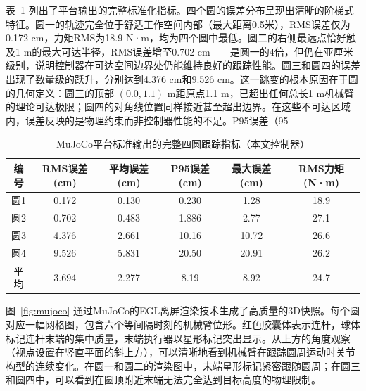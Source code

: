 \documentclass{article}
\begin{document}
表~\ref{tab:metrics} 列出了平台输出的完整标准化指标。四个圆的误差分布呈现出清晰的阶梯式特征。圆一的轨迹完全位于舒适工作空间内部（最大距离0.5米），RMS误差仅为0.172 cm，力矩RMS为18.9 N·m，均为四个圆中最低。圆二的右侧最远点恰好触及1 m的最大可达半径，RMS误差增至0.702 cm——是圆一的4倍，但仍在亚厘米级别，说明控制器在可达空间边界处仍能维持良好的跟踪性能。圆三和圆四的误差出现了数量级的跃升，分别达到4.376 cm和9.526 cm。这一跳变的根本原因在于圆的几何定义：圆三的顶部 \((0.0, 1.1)\) m距原点1.1 m，已超出任何总长1 m机械臂的理论可达极限；圆四的对角线位置同样接近甚至超出边界。在这些不可达区域内，误差反映的是物理约束而非控制器性能的不足。P95误差（95\\%

\begin{table}[H]
\centering
\caption{MuJoCo平台标准输出的完整四圆跟踪指标（本文控制器）}
\label{tab:metrics}
\begin{tabular}{cccccc}
\toprule
\textbf{编号} & \textbf{RMS误差 (cm)} & \textbf{平均误差 (cm)} & \textbf{P95误差 (cm)} & \textbf{最大误差 (cm)} & \textbf{RMS力矩 (N·m)} \\
\midrule
圆1 & 0.172 & 0.130 & 0.230 & 1.28 & 18.9 \\
圆2 & 0.702 & 0.483 & 1.886 & 2.77 & 27.1 \\
圆3 & 4.376 & 2.661 & 10.16 & 10.72 & 26.6 \\
圆4 & 9.526 & 5.831 & 20.50 & 20.91 & 26.2 \\
\midrule
平均 & 3.694 & 2.277 & 8.19 & 8.92 & 24.7 \\
\bottomrule
\end{tabular}
\end{table}

图~\ref{fig:mujoco} 通过MuJoCo的EGL离屏渲染技术生成了高质量的3D快照。每个圆对应一幅网格图，包含六个等间隔时刻的机械臂位形。红色胶囊体表示连杆，球体标记连杆末端的集中质量，末端执行器以星形标记突出显示。从上方的角度观察（视点设置在竖直平面的斜上方），可以清晰地看到机械臂在跟踪圆周运动时关节构型的连续变化。在圆一和圆二的渲染图中，末端星形标记紧密跟随圆周；在圆三和圆四中，可以看到在圆顶附近末端无法完全达到目标高度的物理限制。
\end{document}
